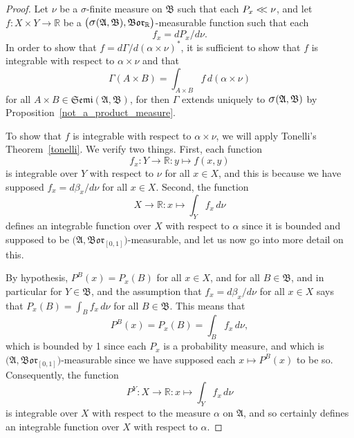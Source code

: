 \documentclass[
twoside=true,
paper=letter,
fontsize=9pt,
pagesize=auto,
leqno,
openany,
headsepline,
overfullrule,
]{scrbook}
\theoremstyle{plain}
\theoremstyle{plain}
\theoremstyle{definition}
\theoremstyle{bfnoteitalic}
\theoremstyle{bfnoteroman}
\newcommand{\sigalg}[1]{\mathfrak{#1}}
\newcommand{\borel}{\mathfrak{Bor}}
\newcommand{\sagb}{\mathop{\hbox{\large{$\sigma$}}}\nolimits}
\newcommand{\textsigma}{\hbox{\large{$\sigma$}}\kern-1pt}
\newcommand{\R}{\mathbb{R}}
\newcommand{\sigmaalgebra}{\sigalg{A}}
\newcommand{\sigmaalgebraii}{\sigalg{B}}
\newcommand{\productsemiring}[2]{\mathfrak{Semi}(#1,#2)}
\newcommand{\productsig}[2]{\sagb(#1,#2)}
\newcommand{\funcf}{f}
\newcommand{\function}{f}
\newcommand{\measurespace}{X}
\newcommand{\measurespaceii}{Y}
\newcommand{\abscont}{\mathrel{< \kern-3.5pt <}}
\newcommand{\measnu}{\nu}
\newcommand{\pspace}{\measurespace}%
\newcommand{\sspace}{\measurespaceii}%
\newcommand{\pspaceset}{A}
\newcommand{\sspaceset}{B}
\newcommand{\pspaceelt}{x}
\newcommand{\sspaceelt}{y}
\newcommand{\sspacesig}{\sigalg{B}}
\newcommand{\pspacesig}{\sigalg{A}}
\newcommand{\measonprod}{\Gamma}%
\newcommand{\marginalone}{\alpha}%
\newcommand{\marginaltwo}{\beta}%
\newcommand{\prior}{\marginalone}
\newcommand{\predictive}{\marginaltwo}
\begin{document}
\begin{proof}
Let $\measnu$ be a \textsigma\hyp{}finite measure on $\sigmaalgebraii$
such that each
$P_\pspaceelt\abscont \measnu$, and let
$\funcf : \pspace\times\sspace\to\R$ be a
$\bigl(\productsig{\pspacesig}{\sspacesig},\borel_\R\bigr)$\hyp{}measurable function
such that each
\[
\function_\pspaceelt
=
d P_\pspaceelt/d\measnu.
\]
In order to show that
$\funcf
=
d\measonprod/d(\prior \times\measnu)^*$,
it is sufficient to show that
$\funcf$
is integrable with respect to
$\prior\times\measnu$
and that
\[
\measonprod(\pspaceset\times\sspaceset)
=
\int_{\pspaceset\times\sspaceset}
\function \, d(\prior\times\measnu)
\]
for all
$\pspaceset\times\sspaceset
\in\productsemiring{\pspacesig}{\sspacesig}$,
for then $\measonprod$ extends uniquely to
$\productsig{\pspacesig}{\sspacesig}$
by Proposition~\ref{not_a_product_measure}.

To show that $\function$ is integrable with respect to
$\prior\times\measnu$, we will apply Tonelli's Theorem~\ref{tonelli}.
We verify two things. First, each function
\[
\function_\pspaceelt:\sspace\to\R
:\sspaceelt\mapsto \function(\pspaceelt,\sspaceelt)
\]
is integrable over
$\sspace$ with respect to $\measnu$ for all
$\pspaceelt\in\pspace$,
and this is because  we have supposed
$\function_\pspaceelt
=
d\predictive_\pspaceelt/d\measnu$
for all $\pspaceelt\in\pspace$. Second, the function
\[
\pspace\to\R:
\pspaceelt\mapsto \int_\sspace\function_\pspaceelt\, d\measnu
\]
defines an integrable function over $\pspace$ with respect to $\prior$ since it is bounded and supposed to be
$\bigl(\sigmaalgebra, \borel_{[0,1]}\bigr)$\hyp{}measurable, and let us now go into more detail on this.

By hypothesis,
$P^\sspaceset(\pspaceelt)
= P_\pspaceelt(\sspaceset)$
for all
$\pspaceelt\in\pspace$, and
for all $\sspaceset\in\sspacesig$, and in particular for
$\sspace\in\sspacesig$, and  the assumption that
$\funcf_\pspaceelt
=
d\predictive_\pspaceelt/d\measnu$
for all $\pspaceelt\in\pspace$ says that
$P_\pspaceelt(\sspaceset)
= \int_\sspaceset\function_\pspaceelt\,d\measnu$
for all $\sspaceset\in\sspacesig$.
This means  that
\[
P^\sspaceset(\pspaceelt)
= P_\pspaceelt(\sspaceset)
=
\int_\sspaceset\function_\pspaceelt\,d\measnu,
\]
which is bounded by 1 since each $P_\pspaceelt$ is a probability measure, and which is
$\bigl(\sigmaalgebra, \borel_{[0,1]}\bigr)$\hyp{}measurable since we have supposed each
$\pspaceelt\mapsto P^\sspaceset(\pspaceelt)$ to be so.
Consequently, the function
\[
P^\sspace : \pspace\to\R:
\pspaceelt \mapsto
\int_\sspace \funcf_\pspaceelt\,d\measnu
\]
is integrable over $\pspace$ with respect to the measure $\prior$ on
$\pspacesig$, and so certainly defines an integrable function over
$\pspace$ with respect to  $\prior$.


\end{proof}
\end{document}
